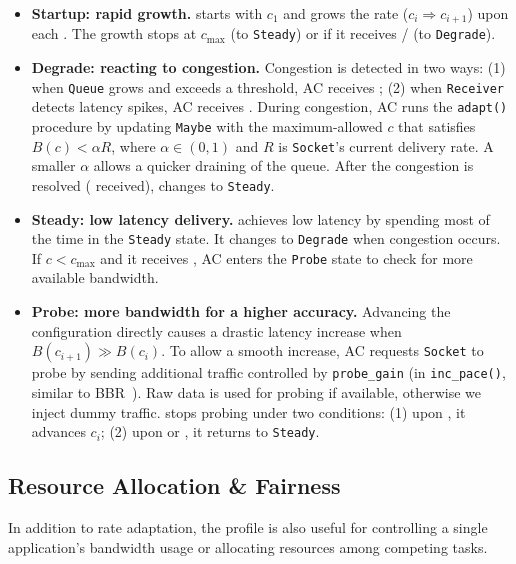 \begin{itemize}[leftmargin=*, topsep=3pt, itemsep=0pt]

\item \textbf{Startup: rapid growth.} \sysname{} starts with $c_1$ and grows the
  rate ($c_i \Rightarrow c_{i+1}$) upon each \qe{}. The growth stops at
  $c_{\max}$ (to \texttt{Steady}) or if it receives \qc{}/\rc{} (to
  \texttt{Degrade}).

\item \textbf{Degrade: reacting to congestion.} Congestion is detected in two
  ways: (1) when \texttt{Queue} grows and exceeds a threshold, AC receives
  \qc{}; (2) when \texttt{Receiver} detects latency spikes, AC receives
  \rc{}. During congestion, AC runs the \texttt{adapt()} procedure by updating
  \texttt{Maybe} with the maximum-allowed $c$ that satisfies $B(c) < \alpha R$,
  where $\alpha \in (0, 1)$ and $R$ is \texttt{Socket}'s current delivery
  rate. A smaller $\alpha$ allows a quicker draining of the queue. After the
  congestion is resolved (\qe{} received), \sysname{} changes to
  \texttt{Steady}.

\item \textbf{Steady: low latency delivery.} \sysname{} achieves low latency by
  spending most of the time in the \texttt{Steady} state. It changes to
  \texttt{Degrade} when congestion occurs. If $c < c_{\max}$ and it receives
  \qe{}, AC enters the \texttt{Probe} state to check for more available
  bandwidth.

\item \textbf{Probe: more bandwidth for a higher accuracy.} Advancing the
  configuration directly causes a drastic latency increase when
  $B(c_{i+1}) \gg B(c_i)$. To allow a smooth increase, AC requests
  \texttt{Socket} to probe by sending additional traffic controlled by
  \texttt{probe\_gain} (in \texttt{inc\_pace()}, similar to
  BBR~\cite{cardwell2017bbr}). Raw data is used for probing if available,
  otherwise we inject dummy traffic. \sysname{} stops probing under two
  conditions: (1) upon \spd{}, it advances $c_i$; (2) upon \qc{} or \rc{}, it
  returns to \texttt{Steady}.

\end{itemize}

\subsection{Resource Allocation \& Fairness}

In addition to rate adaptation, the profile is also useful for controlling a
single application's bandwidth usage or allocating resources among competing
tasks.


